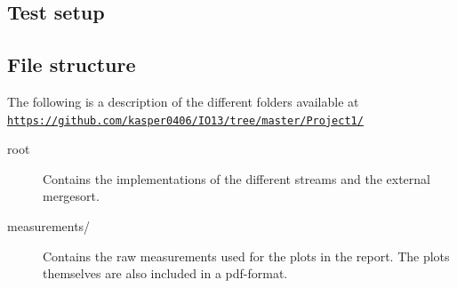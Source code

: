 \documentclass[a4paper,12pt]{article}
\begin{document}
\subsection{Test setup}


\subsection{File structure}
The following is a description of the different folders available at
\\
\texttt{\url{https://github.com/kasper0406/IO13/tree/master/Project1/}}
\begin{description}
\item[root] Contains the implementations of the different streams and
  the external mergesort.

\item[measurements/] Contains the raw measurements used for the plots in the
  report. The plots themselves are also included in a pdf-format.
\end{description}
\end{document}
